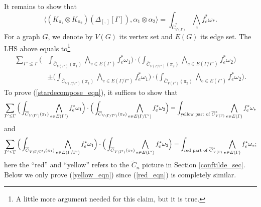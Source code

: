 \documentclass[11pt]{article}
\theoremstyle{definition}
\theoremstyle{remark}
\def\wt#1{\widetilde{#1}}
\def\ov#1{\overline{#1}}
\def\tn#1{\textnormal{#1}}
\begin{document}
It remains to show that 
\begin{equation}\label{stardecompose_eqn}
\big\langle (K_{\pi_1}\otimes K_{\pi_2})(\Delta_{[,]}[\Gamma]), \alpha_1\otimes\alpha_2 \big\rangle=
\int_{\ov{C}^*_{V(\Gamma)}}\bigwedge_{e}f_e^*{\omega_*}. 
\end{equation}
For a graph $G$, we denote by $V(G)$ its vertex set and $E(G)$ its edge set. 
The LHS above equals to\footnote{
A little more argument needed for this claim, but it is true.} 
\begin{align*}
\sum_{\Gamma'\le\Gamma}
\Big(&\int_{\ov{C}_{V(\Gamma')}(\pi_1)}
\bigwedge_{e\in E(\Gamma')}f_e^*\omega_1\Big)
\cdot
\Big(\int_{\ov{C}_{V(\Gamma/\Gamma')}(\pi_2)}
\bigwedge_{e\in E(\Gamma/\Gamma')}f_e^*\omega_2\Big)\\
&\pm
\Big(\int_{\ov{C}_{V(\Gamma/\Gamma')}(\pi_1)}
\bigwedge_{e\in E(\Gamma/\Gamma')}f_e^*\omega_1\Big)
\cdot
\Big(\int_{\ov{C}_{V(\Gamma')}(\pi_2)}
\bigwedge_{e\in E(\Gamma')}f_e^*\omega_2\Big).
\end{align*}
To prove (\ref{stardecompose_eqn}), it suffices to show that 
\begin{equation}\label{yellow_eqn}
\sum_{\Gamma'\le\Gamma}
\Big(\int_{\ov{C}_{V(\Gamma')}(\pi_1)}
\bigwedge_{e\in E(\Gamma')}f_e^*\omega_1\Big)
\cdot
\Big(\int_{\ov{C}_{V(\Gamma/\Gamma')}(\pi_2)}
\bigwedge_{e\in E(\Gamma/\Gamma')}f_e^*\omega_2\Big)=
\int_{\tn{yellow part of }\ov{C}^*_{V(\Gamma)}}\bigwedge_{e\in E(\Gamma)}f_e^*{\omega_*}
\end{equation}
and 
\begin{equation}\label{red_eqn}
\sum_{\Gamma'\le\Gamma}
\Big(\int_{\ov{C}_{V(\Gamma/\Gamma')}(\pi_1)}
\bigwedge_{e\in E(\Gamma/\Gamma')}f_e^*\omega_1\Big)
\cdot
\Big(\int_{\ov{C}_{V(\Gamma')}(\pi_2)}
\bigwedge_{e\in E(\Gamma')}f_e^*\omega_2\Big)=
\int_{\tn{red part of }\ov{C}^*_{V(\Gamma)}}\bigwedge_{e\in E(\Gamma)}f_e^*{\omega_*};
\end{equation}
here the ``red'' and ``yellow'' refers to the $\wt{C}_n$ picture in Section \ref{conftilde_sec}. 
Below we only prove (\ref{yellow_eqn}) since (\ref{red_eqn}) is completely similar. 
\end{document}
